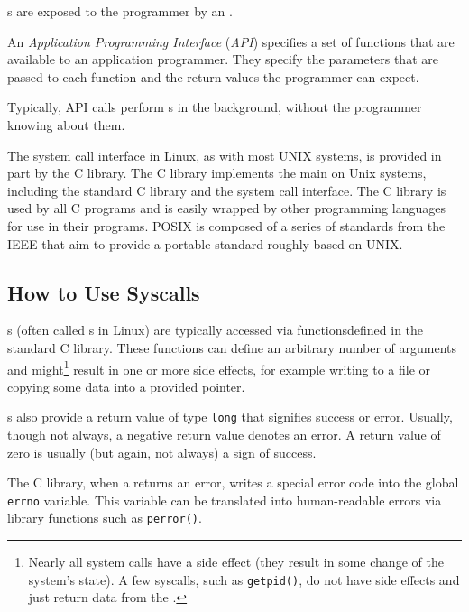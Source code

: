 s are exposed to the programmer by an .
\begin{definition}\label{def:API}
  An \emph{Application Programming Interface} (\emph{API}) specifies a set of functions that are available to an application programmer.
  They specify the parameters that are passed to each function and the return values the programmer can expect.

  Typically, API calls perform s in the background, without the programmer knowing about them.
\end{definition}

The system call interface in Linux, as with most UNIX systems, is provided in part by the C library.
The C library implements the main  on Unix systems, including the standard C library and the system call interface.
The C library is used by all C programs and is easily wrapped by other programming languages for use in their programs.
POSIX is composed of a series of standards from the IEEE that aim to provide a portable  standard roughly based on UNIX.\@

\subsection{How to Use Syscalls}\label{subsec:How_To_Use_Syscalls}
s (often called s in Linux) are typically accessed via functionsdefined in the standard C library.
These functions can define an arbitrary number of arguments and might\footnote{Nearly all system calls have a side effect (they result in some change of the system’s state). A few syscalls, such as \texttt{getpid()}, do not have side effects and just return data from the .} result in one or more side effects, for example writing to a file or copying some data into a provided pointer.

s also provide a return value of type \texttt{long} that signifies success or error.
Usually, though not always, a negative return value denotes an error.
A return value of zero is usually (but again, not always) a sign of success.

The C library, when a  returns an error, writes a special error code into the global \texttt{errno} variable.
This variable can be translated into human-readable errors via library functions such as \texttt{perror()}.

